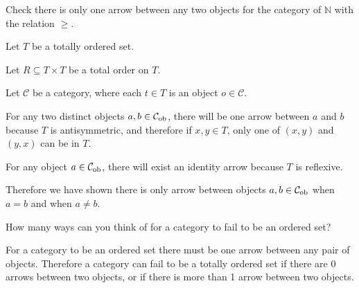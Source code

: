 \begin{ttta}
	Check there is only one arrow between any two objects for the category of $\mathbb{N}$ with the relation $\geq$.
\end{ttta}
\begin{proofitem}
	\item Let $T$ be a totally ordered set.
	\item Let $R\subseteq T\times T$ be a total order on $T$.
	\item Let $\mathcal{C}$ be a category, where each $t\in T$ is an
	object $o\in\mathcal{C}$.
	\item For any two distinct objects $a, b\in\mathcal{C}_{\text{ob}}{}$, there will be one arrow
	between $a$ and $b$ because $T$ is antisymmetric, and therefore if $x, y \in
		T$, only one of $(x, y)$ and $(y, x)$ can be in $T$.
	\item For any object $a\in\mathcal{C}_{\text{ob}}{}$, there will exist an identity arrow because
	$T$ is reflexive.
	\item Therefore we have shown there is only arrow between objects $a, b\in
		\mathcal{C}_{\text{ob}}{}$ when $a=b$ and when $a\neq b$.
\end{proofitem}

\begin{ttta}
	How many ways can you think of for a category to fail to be an
	ordered set?
\end{ttta}
\begin{proofitem}
	\item For a category to be an ordered set there must be one arrow between any
	pair of objects. Therefore a category can fail to be a totally ordered set
	if there are 0 arrows between two objects, or if there is more than 1 arrow
	between two objects.
\end{proofitem}

